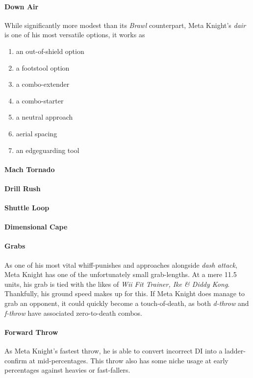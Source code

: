 \paragraph{Down Air}
While significantly more modest than its \textit{Brawl} counterpart, Meta Knight's \textit{dair} is one of his most versatile options, it works as
	\begin{enumerate}[label = \roman*.]
		\item an out-of-shield option
		\item a footstool option
		\item a combo-extender
		\item a combo-starter
		\item a neutral approach
		\item aerial spacing
		\item an edgeguarding tool
	\end{enumerate}
\paragraph[Neutral Special]{Mach Tornado}
\paragraph[Side Special]{Drill Rush}
\paragraph[Up Special]{Shuttle Loop}
\paragraph[Down Special]{Dimensional Cape}
\paragraph{Grabs}
As one of his most vital whiff-punishes and approaches alongside \textit{dash attack}, Meta Knight has one of the unfortunately small grab-lengths. At a mere 11.5 units, his grab is tied with the likes of \textit{Wii Fit Trainer, Ike \& Diddy Kong}. Thankfully, his ground speed makes up for this. If Meta Knight does manage to grab an opponent, it could quickly become a touch-of-death, as both \textit{d-throw} and \textit{f-throw} have associated zero-to-death combos.
\paragraph{Forward Throw}
As Meta Knight's fastest throw, he is able to convert incorrect DI into a ladder-confirm at mid-percentages. This throw also has some niche usage at early percentages against heavies or fast-fallers.
